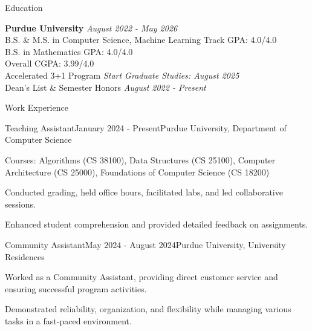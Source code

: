 \documentclass[
    11pt, %
]{resume} %
\begin{document}

\small
\begin{rSection}{Education}

    \textbf{Purdue University} \hfill \textit{August 2022 - May 2026} \\
    B.S. \& M.S. in Computer Science, Machine Learning Track \hfill GPA: 4.0/4.0 \\
    B.S. in Mathematics \hfill GPA: 4.0/4.0 \\
    \hspace*{\fill}  Overall CGPA: 3.99/4.0 \\
    Accelerated 3+1 Program \hfill {\em Start Graduate Studies: August 2025} \\
    Dean's List \& Semester Honors \hfill {\em August 2022 - Present}

\end{rSection}

\vspace*{-0.5cm}


\begin{rSection}{Work Experience}
\vspace*{-0.3cm}
    \begin{rSubsection}{Teaching Assistant}{January 2024 - Present}{Purdue University, Department of Computer Science}{}
        \item Courses: Algorithms (CS 38100), Data Structures (CS 25100), Computer Architecture (CS 25000), Foundations of Computer Science (CS 18200)
        \item Conducted grading, held office hours, facilitated labs, and led collaborative sessions.
        \item Enhanced student comprehension and provided detailed feedback on assignments.
    \end{rSubsection}
    \begin{rSubsection}{Community Assistant}{May 2024 - August 2024}{Purdue University, University Residences}{}
      \item Worked as a Community Assistant, providing direct customer service and ensuring successful program activities. 
      \item Demonstrated reliability, organization, and flexibility while managing various tasks in a fast-paced environment.
    \end{rSubsection}
\end{rSection}
\end{document}
